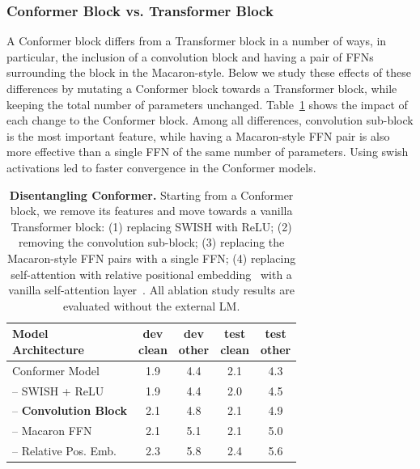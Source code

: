 \subsubsection{Conformer Block vs. Transformer Block}
\label{ablate_conformer_transformer}
A Conformer block differs from a Transformer block in a number of ways, in particular, the inclusion of a convolution block and having a pair of FFNs surrounding the block in the Macaron-style. Below we study these effects of these differences by mutating a Conformer block towards a Transformer block, while keeping the total number of parameters unchanged. Table~\ref{tab:ablation_model} shows the impact of each change to the Conformer block.
%
Among all differences, convolution sub-block is the most important feature, while having a Macaron-style FFN pair is also more effective than a single FFN of the same number of parameters.
Using swish activations led to faster convergence in the Conformer models.
\begin{table}[h]
\caption{\textbf{Disentangling Conformer.}
Starting from a Conformer block, we remove its features and move towards a vanilla Transformer block: (1) replacing SWISH with ReLU; (2) removing the convolution sub-block; (3) replacing the Macaron-style FFN pairs with a single FFN; (4) replacing self-attention with relative positional embedding~\cite{dai2019transformerxl} with a vanilla self-attention layer~\cite{vaswani2017attention}.
All ablation study results are evaluated without the external LM.}
\label{tab:ablation_model}
\begin{tabular}{@{}l|cccc@{}}
\hline 
\makecell{Model\\ Architecture} & \makecell{dev\\ clean} & \makecell{dev\\ other} & \makecell{test\\ clean} & \makecell{test\\ other} \\
\hline 
\hline 
Conformer Model & 1.9 & 4.4 & 2.1 & 4.3 \tabularnewline
\enskip -- SWISH + ReLU & 1.9 & 4.4 & 2.0 & 4.5 \tabularnewline
\enskip\enskip-- \textbf{Convolution Block} & 2.1 & 4.8 & 2.1 & 4.9 \tabularnewline
\enskip\enskip\enskip-- Macaron FFN & 2.1 & 5.1 & 2.1 & 5.0 \tabularnewline
\enskip\enskip\enskip\enskip-- {Relative Pos. Emb.} & 2.3 & 5.8 & 2.4 & 5.6 \tabularnewline
\hline 
\end{tabular}

\vskip -0.2in
\end{table}

